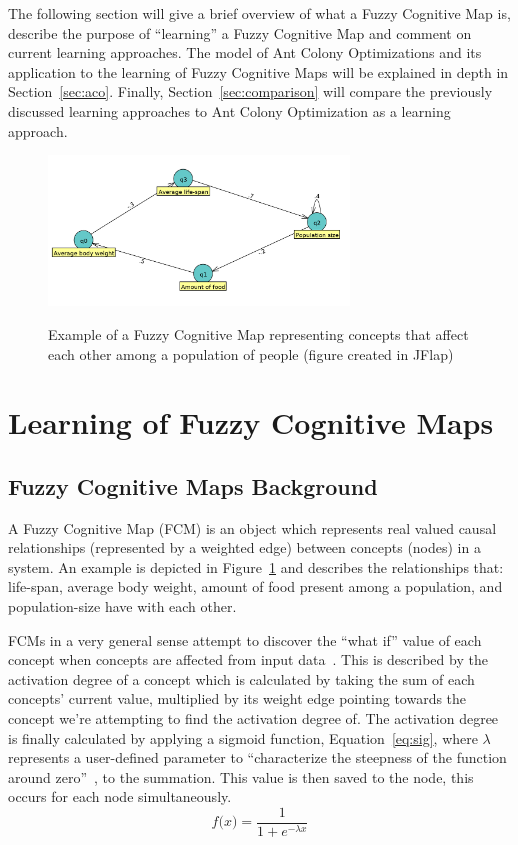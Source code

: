 \documentclass{umm-senior-sem}
\begin{document}
The following section will give a brief overview of what a Fuzzy Cognitive Map is, describe the purpose of ``learning'' a Fuzzy Cognitive Map and comment on current learning approaches. The model of Ant Colony Optimizations and its application to the learning of Fuzzy Cognitive Maps will be explained in depth in Section~\ref{sec:aco}. Finally, Section~\ref{sec:comparison} will compare the previously discussed learning approaches to Ant Colony Optimization as a learning approach.

\begin{figure}
\includegraphics[width = 8cm, height = 4cm]{images/population.png}
\label{fig:fcm}
\caption{Example of a Fuzzy Cognitive Map representing concepts that affect each other among a population of people (figure created in JFlap)}
\end{figure}

\section{Learning of Fuzzy Cognitive Maps}
\label{fcm}
\subsection{Fuzzy Cognitive Maps Background}
A Fuzzy Cognitive Map (FCM) is an object which represents real valued causal relationships (represented by a weighted edge) between concepts (nodes) in a system. An example is depicted in Figure~\ref{fig:fcm} and describes the relationships that: life-span, average body weight, amount of food present among a population, and population-size have with each other. 

FCMs in a very general sense attempt to discover the ``what if'' value of each concept when concepts are affected from input data~\cite{FCMbg:1999}. This is described by the activation degree of a concept which is calculated by taking the sum of each concepts' current value, multiplied by its weight edge pointing towards the concept we're attempting to find the activation degree of. The activation degree is finally calculated by applying a sigmoid function, Equation~\ref{eq:sig}, where $\lambda$ represents a user-defined parameter to ``characterize the steepness of the function around zero''~\cite{main:2012}, to the summation. This value is then saved to the node, this occurs for each node simultaneously.
\begin{equation}
\label{eq:sig}
 f \big(x\big) = \frac{1}{1+ e^{-\lambda x} } 
\end{equation}
\end{document}

